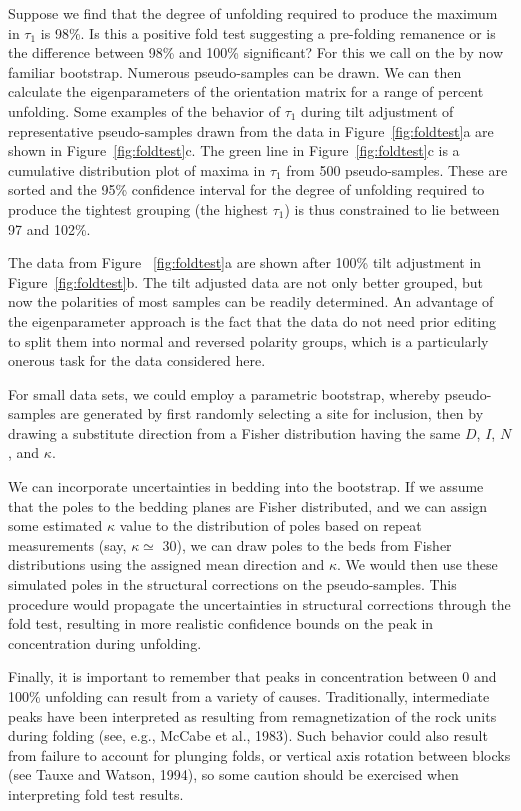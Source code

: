 Suppose we find that the degree of unfolding required to
produce the maximum in $\tau_1$ is 98\%.  Is this a positive fold test
suggesting a pre-folding remanence or is the difference between 98\% and
100\% significant?  For this we call on the by now familiar bootstrap.  
Numerous pseudo-samples  can be drawn. We can then calculate the 
eigenparameters of the orientation matrix
for a range of  percent unfolding.  Some
examples of the behavior of $\tau_1$ during tilt adjustment of representative
pseudo-samples drawn from the data
in Figure~\ref{fig:foldtest}a are shown 
in Figure~\ref{fig:foldtest}c.  The green line in Figure~\ref{fig:foldtest}c is a cumulative distribution plot of maxima in
$\tau_1$ from 500 pseudo-samples.  These are sorted   and the 95\%
confidence interval for the degree of unfolding required to produce the
tightest grouping (the highest $\tau_1$)
 is  thus constrained to lie between 97 and 102\%.  



The data from Figure ~\ref{fig:foldtest}a are shown after 100\% tilt
adjustment
in Figure~\ref{fig:foldtest}b. The tilt adjusted
  data are not only better grouped, but now
the polarities of most samples can be readily determined.  An advantage 
of the eigenparameter
approach is the fact that the data do not need prior editing to
split them into normal and reversed polarity groups, which is  a particularly onerous task
for the data considered here.

For small data sets,  we could  employ a parametric bootstrap, whereby
pseudo-samples are generated by first randomly selecting a site for
inclusion, then by drawing a substitute direction from a Fisher distribution
having the same $D$, $I$, $N$, and $\kappa$. 

We can incorporate uncertainties in bedding into the bootstrap.  If we assume that the poles to the bedding planes are Fisher distributed, and we can assign some estimated $\kappa$ value to the distribution of poles based on repeat measurements (say, $\kappa \simeq $ 30), we can draw poles to the beds from Fisher distributions using the assigned mean direction and $\kappa$.  We would then use these simulated poles in the structural corrections on the pseudo-samples.  This procedure would propagate the uncertainties in structural corrections through the fold test, resulting in more realistic confidence bounds on the peak in concentration during unfolding.   

Finally, it is important to remember that peaks in concentration between 0 and 100\% unfolding can result from a variety of causes. \nocite{tauxe94}   Traditionally, intermediate peaks have been interpreted as resulting from remagnetization  of the rock units during folding (see, e.g., McCabe et al., 1983). \nocite{mccabe83}  Such behavior could also result from failure to account for plunging folds, or vertical axis rotation between blocks  (see Tauxe and Watson, 1994), so some caution should be exercised when interpreting fold test results.  

